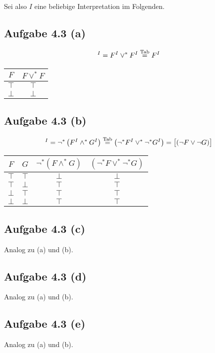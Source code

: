 \documentclass[12pt,a4paper]{article}
\begin{document}
Sei also $I$ eine beliebige Interpretation im Folgenden.

\subsection*{Aufgabe 4.3 (a)}
\begin{align*}
[F\vee F]^I=F^I\vee^\ast F^I\stackeq{\text{Tab}} F^I
\end{align*}
\begin{tabular}{c||c}
$F$ & $F\vee^\ast F$\\ \hline
$\top$ & $\top$\\%
$\bot$ & $\bot$ %
\end{tabular}

\subsection*{Aufgabe 4.3 (b)}
\begin{align*}
[\neg(F\wedge G]^I=\neg^\ast\left(F^I\wedge^\ast G^I\right)\stackeq{\text{Tab}}
\left(\neg^\ast F^I\vee^\ast\neg^\ast G^I\right)=\big[(\neg F\vee\neg G)\big]
\end{align*}
\begin{tabular}{c|c||c|c}
$F$ & $G$ & $\neg^\ast(F\wedge^\ast G)$ & $(\neg^\ast F\vee^\ast\neg^\ast G)$\\ \hline
$\top$ & $\top$ & $\bot$ & $\bot$\\
$\top$ & $\bot$ & $\top$ & $\top$\\
$\bot$ & $\top$ & $\top$ & $\top$\\
$\bot$ & $\bot$ & $\top$ & $\top$
\end{tabular}

\subsection*{Aufgabe 4.3 (c)}
Analog zu (a) und (b).

\subsection*{Aufgabe 4.3 (d)}
Analog zu (a) und (b).

\subsection*{Aufgabe 4.3 (e)}
Analog zu (a) und (b).
\end{document}
